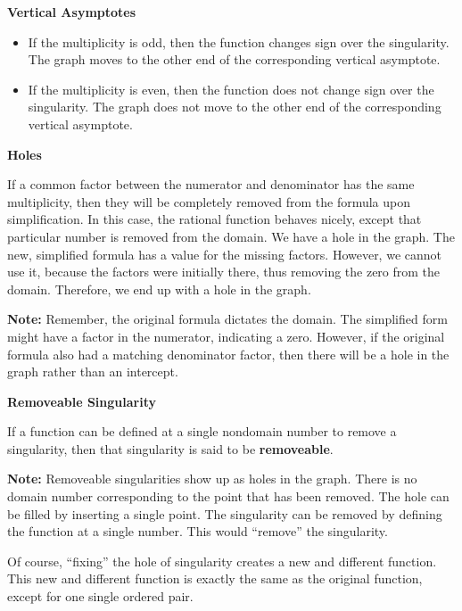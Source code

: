 \documentclass{ximera}
\begin{document}
\textbf{Vertical Asymptotes}

\begin{itemize}
\item If the multiplicity is odd, then the function changes sign over the singularity.  The graph moves to the other end of the corresponding vertical asymptote.
\item If the multiplicity is even, then the function does not change sign over the singularity.  The graph does not move to the other end of the corresponding vertical asymptote. 
\end{itemize}



\textbf{Holes}


If a common factor between the numerator and denominator has the same multiplicity, then they will be completely removed from the formula upon simplification.  In this case, the rational function behaves nicely, except that particular number is removed from the domain.  We have a hole in the graph.  The new, simplified formula has a value for the missing factors.  However, we cannot use it, because the factors were initially there, thus removing the zero from the domain.  Therefore, we end up with a hole in the graph. 



\textbf{Note:} Remember, the original formula dictates the domain. The simplified form might have a factor in the numerator, indicating a zero. However, if the original formula also had a matching denominator factor, then there will be a hole in the graph rather than an intercept. 






\begin{definition} \textbf{\textcolor{green!50!black}{Removeable Singularity}}

If a function can be defined at a single nondomain number to remove a singularity, then that singularity is said to be \textbf{removeable}.

\end{definition}

\textbf{Note:} Removeable singularities show up as holes in the graph.  There is no domain number corresponding to the point that has been removed. The hole can be filled by inserting a single point.  The singularity can be removed by defining the function at a single number.  This would ``remove'' the singularity. 

Of course, ``fixing'' the hole of singularity creates a new and different function.  This new and different function is exactly the same as the original function, except for one single ordered pair.
\end{document}
